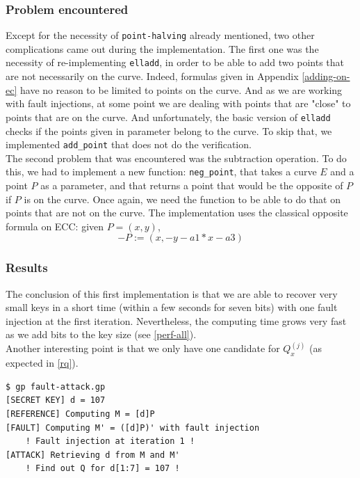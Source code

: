 \documentclass[journal]{IEEEtran}
\begin{document}
\subsubsection{Problem encountered}
Except for the necessity of {\tt point-halving} already mentioned, two other complications came out during the implementation. The first one was the necessity of re-implementing {\tt elladd}, in 
order to be able to add two points that are not necessarily on the curve. Indeed, formulas given in Appendix \ref{adding-on-ec} have no reason to be limited to points on the curve. And as we are working with 
fault injections, at some point we are dealing with points that are "close" to points that are on the curve. And unfortunately, the basic version of {\tt elladd} checks if the points given in parameter belong to the curve.
To skip that, we implemented {\tt add\_point} that does not do the verification.\\ 

The second problem that was encountered was the subtraction operation. To do this, we had to implement a new function: {\tt neg\_point}, that takes a curve $E$ and a point $P$ as a parameter, and that returns a point that would be the
opposite of $P$ if $P$ is on the curve. Once again, we need the function to be able to do that on points that are not on the curve. The implementation uses the classical opposite formula on ECC: given $P = (x, y)$,
$$- P := (x, -y - a1*x - a3)$$

\subsubsection{Results}
The conclusion of this first implementation is that we are able to recover very small keys in a short time (within a few seconds for seven bits) with one fault injection at the first iteration.
Nevertheless, the computing time grows very fast as we add bits to the key size (see \ref{perf-all}).\\
Another interesting point is that we only have one candidate for $Q_x^{(j)}$ (as expected in \ref{rq}).

\begin{footnotesize}
\begin{verbatim}
$ gp fault-attack.gp 
[SECRET KEY] d = 107
[REFERENCE] Computing M = [d]P
[FAULT] Computing M' = ([d]P)' with fault injection
    ! Fault injection at iteration 1 !
[ATTACK] Retrieving d from M and M'
    ! Find out Q for d[1:7] = 107 !
\end{verbatim}
\end{footnotesize}
\end{document}
